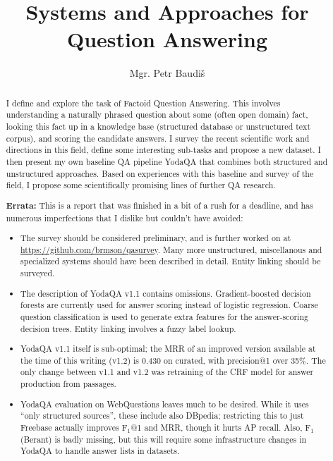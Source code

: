 \documentclass[11pt,a4paper,notitlepage]{report}
\title{Systems and Approaches for Question Answering}
\author{Mgr. Petr Baudiš}
\begin{document}
\maketitle

\begin{abstract}%
	I define and explore the task of Factoid Question Answering.
	This involves understanding a naturally phrased question
	about some (often open domain) fact, looking this fact up
	in a knowledge base (structured database or unstructured
	text corpus), and scoring the candidate answers.
	I survey the recent scientific work and directions in this
	field, define some interesting sub-tasks and propose a new dataset.
	I then present my own baseline QA pipeline YodaQA that
	combines both structured and unstructured approaches.
	Based on experiences with this baseline and survey of the
	field, I propose some scientifically promising lines of further
	QA research.

	\vspace{3ex}

	\textbf{Errata:} This is a report that was finished in a bit
	of a rush for a deadline, and has numerous imperfections that I dislike
	but couldn't have avoided:

	\begin{itemize}
		\item The survey should be considered preliminary, and
			is further worked on at \url{https://github.com/brmson/qasurvey}.
			Many more unstructured, miscellanous and specialized systems
			should have been described in detail.
			Entity linking should be surveyed.
		\item The description of YodaQA v1.1 contains omissions.
			Gradient-boosted decision forests are currently used
			for answer scoring instead of logistic regression.
			Coarse question classification is used to generate
			extra features for the answer-scoring decision trees.
			Entity linking involves a fuzzy label lookup.
		\item YodaQA v1.1 itself is sub-optimal; the MRR of an improved
			version available at the time of this writing (v1.2)
			is 0.430 on curated, with precision@1 over 35\%.
			The only change between v1.1 and v1.2 was retraining
			of the CRF model for answer production from passages.
		\item YodaQA evaluation on WebQuestions leaves much to be desired.
			While it uses ``only structured sources'', these include
			also DBpedia; restricting this to just Freebase actually
			improves F$_1$@1 and MRR, though it hurts AP recall.
			Also, F$_1$ (Berant) is badly missing,
			but this will require some infrastructure changes in YodaQA
			to handle answer lists in datasets.
	\end{itemize}
\end{abstract}

\tableofcontents







\appendix

%



\end{document}

